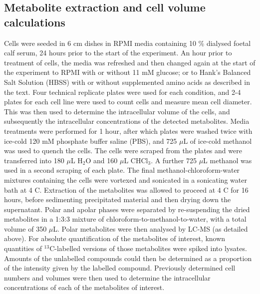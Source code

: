 \subsection{Metabolite extraction and cell volume calculations}
\label{subsec:methods_pkm2_proteomics}
Cells were seeded in 6 cm dishes in RPMI media containing 10 \% dialysed foetal calf serum, 24 hours prior to the start of the experiment. An hour prior to treatment of cells, the media was refreshed and then changed again at the start of the experiment to RPMI with or without 11 mM glucose; or to Hank's Balanced Salt Solution (HBSS) with or without supplemented amino acids as described in the text. Four technical replicate plates were used for each condition, and 2-4 plates for each cell line were used to count cells and measure mean cell diameter. This was then used to determine the intracellular volume of the cells, and subsequently the intracellular concentrations of the detected metabolites. Media treatments were performed for 1 hour, after which plates were washed twice with ice-cold 120 mM phosphate buffer saline (PBS), and 725 $\mu$L of ice-cold methanol was used to quench the cells. The cells were scraped from the plates and were transferred into 180 $\mu$L H$_{2}$O and 160 $\mu$L CHCl$_{3}$. A further 725 $\mu$L methanol was used in a second scraping of each plate. The final methanol-chloroform-water mixtures containing the cells were vortexed and sonicated in a sonicating water bath at  4 \textdegree C. Extraction of the metabolites was allowed to proceed at 4 \textdegree C for 16 hours, before sedimenting precipitated material and then drying down the supernatant. Polar and apolar phases were separated by re-suspending the dried metabolites in a 1:3:3 mixture of chloroform-to-methanol-to-water, with a total volume of 350 $\mu$L. Polar metabolites were then analysed by LC-MS (as detailed above). For absolute quantification of the metabolites of interest, known quantities of $^{13}$C-labelled versions of those metabolites were spiked into lysates. Amounts of the unlabelled compounds could then be determined as a proportion of the intensity given by the labelled compound. Previously determined cell numbers and volumes were then used to determine the intracellular concentrations of each of the metabolites of interest. 
%
%
%
